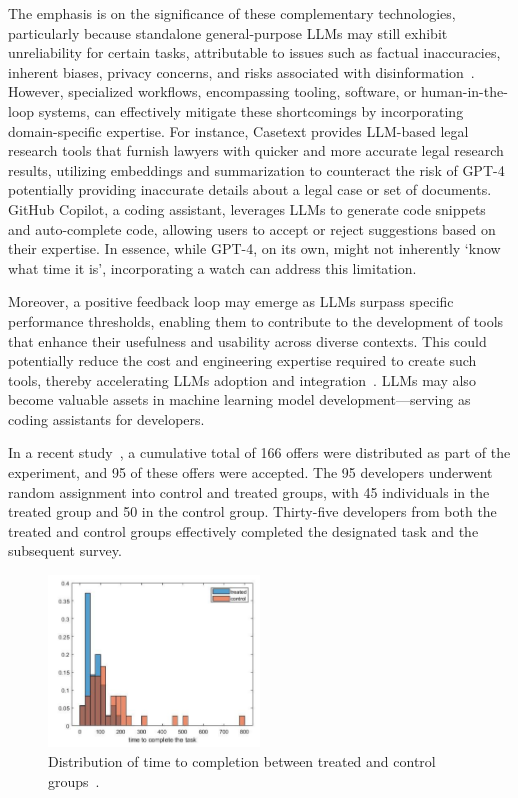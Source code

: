 \documentclass[a4paper,oneside]{book}
\begin{document}
The emphasis is on the significance of these complementary technologies, particularly because standalone general-purpose LLMs may still exhibit unreliability for certain tasks, attributable to issues such as factual inaccuracies, inherent biases, privacy concerns, and risks associated with disinformation~\cite{abid2021persistent, schramowski2022large, goldstein2023generative}. However, specialized workflows, encompassing tooling, software, or human-in-the-loop systems, can effectively mitigate these shortcomings by incorporating domain-specific expertise. For instance, Casetext provides LLM-based legal research tools that furnish lawyers with quicker and more accurate legal research results, utilizing embeddings and summarization to counteract the risk of GPT-4 potentially providing inaccurate details about a legal case or set of documents. GitHub Copilot, a coding assistant, leverages LLMs to generate code snippets and auto-complete code, allowing users to accept or reject suggestions based on their expertise. In essence, while GPT-4, on its own, might not inherently `know what time it is', incorporating a watch can address this limitation.

Moreover, a positive feedback loop may emerge as LLMs surpass specific performance thresholds, enabling them to contribute to the development of tools that enhance their usefulness and usability across diverse contexts. This could potentially reduce the cost and engineering expertise required to create such tools, thereby accelerating LLMs adoption and integration~\cite{chen2021evaluating, peng2023impact}. LLMs may also become valuable assets in machine learning model development—serving as coding assistants for developers.

In a recent study~\cite{peng2023impact}, a cumulative total of 166 offers were distributed as part of the experiment, and 95 of these offers were accepted. The 95 developers underwent random assignment into control and treated groups, with 45 individuals in the treated group and 50 in the control group. Thirty-five developers from both the treated and control groups effectively completed the designated task and the subsequent survey.

\begin{figure}[!htb]
    \centering
    \includegraphics[width=0.5\textwidth]{img/task_completion_time}
    \caption{Distribution of time to completion between treated and control groups~\cite{peng2023impact}.}\label{fig:task_completion_time}
\end{figure}
\end{document}

